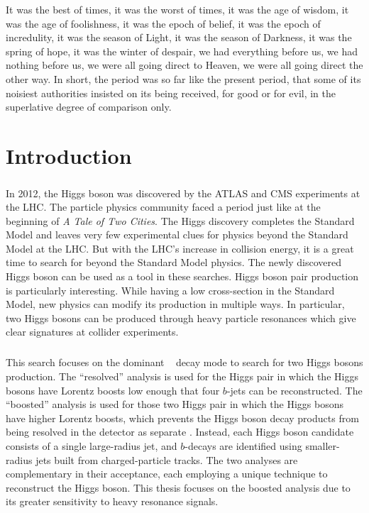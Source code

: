 \begin{savequote}[75mm]
It was the best of times, it was the worst of times, it was the age of wisdom, it was the age of foolishness, it was the epoch of belief, it was the epoch of incredulity, it was the season of Light, it was the season of Darkness, it was the spring of hope, it was the winter of despair, we had everything before us, we had nothing before us, we were all going direct to Heaven, we were all going direct the other way. In short, the period was so far like the present period, that some of its noisiest authorities insisted on its being received, for good or for evil, in the superlative degree of comparison only.
\end{savequote}

\chapter{Introduction}
\label{introduction}

\paragraph{}
In 2012, the Higgs boson was discovered by the ATLAS and CMS experiments at the LHC. 
The particle physics community faced a period just like at the beginning of \textit{A Tale of Two Cities}.
The Higgs discovery completes the Standard Model and leaves very few experimental clues for physics beyond the Standard Model at the LHC.
But with the LHC's increase in collision energy, it is a great time to search for beyond the Standard Model physics.
The newly discovered Higgs boson can be used as a tool in these searches.
Higgs boson pair production is particularly interesting.
While having a low cross-section in the Standard Model, new physics can modify its production in multiple ways. 
In particular, two Higgs bosons can be produced through heavy particle resonances
which give clear signatures at collider experiments.

\paragraph{}
This search focuses on the dominant \hbb~ decay mode to search for two Higgs bosons production. 
The ``resolved'' analysis is used for the Higgs pair in which the Higgs bosons have Lorentz boosts low enough that four $b$-jets can be reconstructed. 
The ``boosted'' analysis is used for those two Higgs pair in which the Higgs bosons have higher Lorentz boosts, which prevents the Higgs boson decay products from being resolved in the detector as separate \bjets. 
Instead, each Higgs boson candidate consists of a single large-radius jet, and $b$-decays are identified using smaller-radius jets built from charged-particle tracks.
The two analyses are complementary in their acceptance, each employing a unique technique to reconstruct the Higgs boson.
This thesis focuses on the boosted analysis due to its greater sensitivity to heavy resonance signals.

